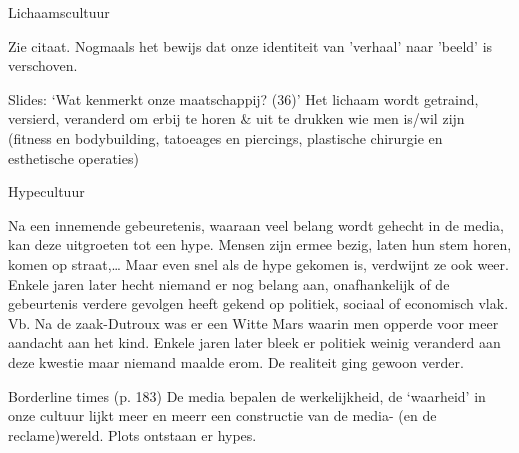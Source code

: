 \documentclass[main.tex]{subfiles}
\begin{document}
\begin{examenvraag}
    \begin{vraag}
        Lichaamscultuur
    \end{vraag}
    \begin{antwoord}
        Zie citaat. Nogmaals het bewijs dat onze identiteit van 'verhaal' naar 'beeld' is verschoven.
        \begin{citaat}{Slides: `Wat kenmerkt onze maatschappij? (36)'}
            Het lichaam wordt getraind, versierd, veranderd om erbij te horen \& uit te drukken wie men is/wil zijn (fitness en 
            bodybuilding, tatoeages en piercings, plastische chirurgie en esthetische operaties)
        \end{citaat}	
    \end{antwoord}
\end{examenvraag}


\begin{examenvraag}
    \begin{vraag}
        Hypecultuur
    \end{vraag}

    \begin{antwoord}
        Na een innemende gebeuretenis,‭ ‬waaraan veel belang wordt gehecht in de media,‭ ‬kan deze 
        uitgroeten tot een‭ ‬hype.‭ ‬Mensen zijn ermee bezig,‭ ‬laten hun stem horen,‭ ‬komen op straat,‭…‬ 
        Maar even snel als de hype gekomen is,‭ ‬verdwijnt ze ook weer.‭ ‬Enkele jaren later hecht 
        niemand er nog belang aan,‭ ‬onafhankelijk of de gebeurtenis verdere gevolgen heeft gekend op 
        politiek,‭ ‬sociaal of economisch vlak.‭ ‬Vb.‭ ‬Na de zaak-Dutroux was er een Witte Mars waarin 
        men opperde voor meer aandacht aan het kind.‭ ‬Enkele jaren later bleek er politiek weinig 
        veranderd aan deze kwestie maar niemand maalde erom.‭ ‬De realiteit ging gewoon verder.
        \begin{citaat}{Borderline times (p. 183)}
            De media bepalen de werkelijkheid, de `waarheid' in onze cultuur lijkt meer en meerr een constructie van de media- (en de reclame)wereld.
            Plots ontstaan er hypes.
        \end{citaat}
    \end{antwoord}
\end{examenvraag}
\end{document}
